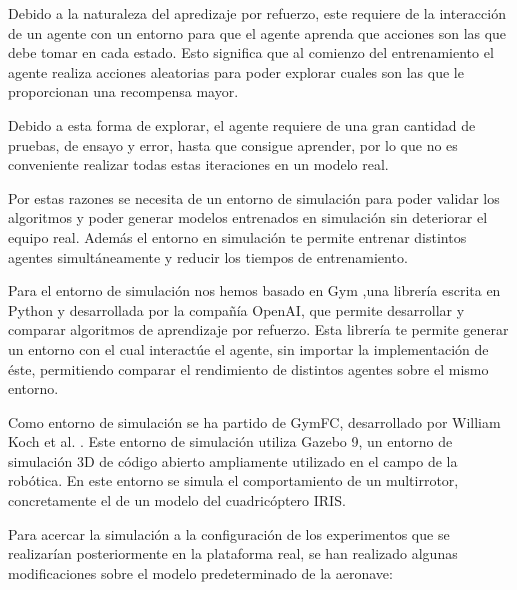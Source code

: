 Debido a la naturaleza del apredizaje por refuerzo, este requiere de la interacción de un agente con un entorno para que el agente aprenda que acciones son las que debe tomar en cada estado. Esto significa que al comienzo del entrenamiento el agente realiza acciones aleatorias para poder explorar cuales son las que le proporcionan una recompensa mayor.

Debido a esta forma de explorar, el agente requiere de una gran cantidad de pruebas, de ensayo y error, hasta que consigue aprender, por lo que no es conveniente realizar todas estas iteraciones en un modelo real.

Por estas razones se necesita de un entorno de simulación para poder validar los algoritmos y poder generar modelos entrenados en simulación sin deteriorar el equipo real. Además el entorno en simulación te permite entrenar distintos agentes simultáneamente y reducir los tiempos de entrenamiento.

Para el entorno de simulación nos hemos basado en Gym ,una librería escrita en Python y desarrollada por la compañía OpenAI, que permite desarrollar y comparar algoritmos de aprendizaje por refuerzo. Esta librería te permite generar un entorno con el cual interactúe el agente, sin importar la implementación de éste, permitiendo comparar el rendimiento de distintos agentes sobre el mismo entorno.

 Como entorno de simulación se ha partido de GymFC, desarrollado por William Koch et al. \cite{koch2019reinforcement}.
Este entorno de simulación utiliza Gazebo 9, un entorno de simulación 3D de código abierto ampliamente utilizado en el campo de la robótica. En este entorno se simula el comportamiento de un multirrotor, concretamente el de un modelo del cuadricóptero IRIS.

Para acercar la simulación a la configuración de los experimentos que se realizarían posteriormente en la plataforma real, se han realizado algunas modificaciones sobre el modelo predeterminado de la aeronave:

